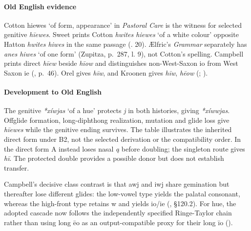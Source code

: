 \documentclass[
  british,
  a4paper,
]{article}
\providecommand{\Recon}[1]{\emph{*#1}}
\begin{document}
\paragraph{Old English evidence}\label{old-english-evidence-41}

Cotton {hiewes} `of form, appearance' in \emph{Pastoral Care} is the
witness for selected genitive \emph{hīewes}. Sweet prints Cotton
\emph{hwites hiewes} `of a white colour' opposite Hatton \emph{hwites
hiwes} in the same passage (. 20). Ælfric's \emph{Grammar} separately has \emph{anes hiwes} `of
one form' (Zupitza, p.~287, l. 9), not Cotton's spelling. Campbell
prints direct \emph{hīew} beside \emph{hīow} and distinguishes
non-West-Saxon io from West Saxon ie
(, p.~46). Orel
gives \emph{hīw}, and Kroonen gives \emph{hīw}, \emph{hēow}
(;
).

\paragraph{Development to Old
English}\label{development-to-old-english-41}

The genitive \Recon{xíwjas} `of a hue' protects \emph{j} in both
histories, giving \emph{*xíwwjas}. Offglide formation, long-diphthong
realization, mutation and glide loss give \emph{hīewes} while the
genitive ending survives. The table illustrates the inherited direct
form under B2, not the selected derivation or the compatibility order.
In the direct form A instead loses nasal \emph{ą} before doubling; the
singleton route gives \emph{hī}. The protected double provides a
possible donor but does not establish transfer.

Campbell's decisive class contrast is that awj and iwj share gemination
but thereafter lose different glides: the low-vowel type yields the
palatal consonant, whereas the high-front type retains w and yields
io/ie (, §120.2). For hue,
the adopted cascade now follows the independently specified Ringe-Taylor
chain rather than using long ēo as an output-compatible proxy for their
long īo ().
\end{document}
